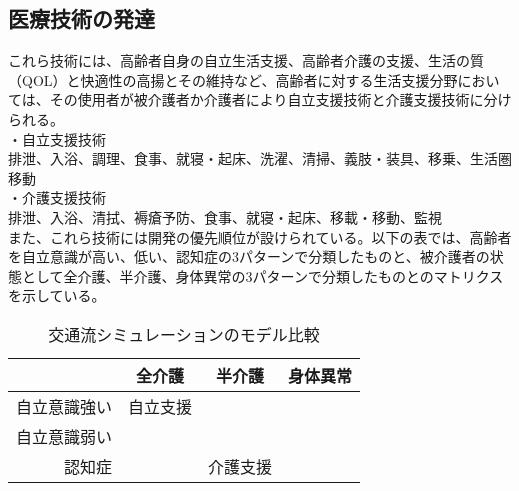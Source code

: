 
\subsection{医療技術の発達}


これら技術には、高齢者自身の自立生活支援、高齢者介護の支援、生活の質（QOL）と快適性の高揚とその維持など、高齢者に対する生活支援分野においては、その使用者が被介護者か介護者により自立支援技術と介護支援技術に分けられる。\\
・自立支援技術 \\
排泄、入浴、調理、食事、就寝・起床、洗濯、清掃、義肢・装具、移乗、生活圏移動 \\
・介護支援技術 \\
排泄、入浴、清拭、褥瘡予防、食事、就寝・起床、移載・移動、監視 \\
また、これら技術には開発の優先順位が設けられている。以下の表では、高齢者を自立意識が高い、低い、認知症の3パターンで分類したものと、被介護者の状態として全介護、半介護、身体異常の3パターンで分類したものとのマトリクスを示している。

\begin{table}[htb]
  \caption[交通流シミュレーションのモデル比較]{交通流シミュレーションのモデル比較}
  \label{model_explaination}
  \centering
  \begin{tabular}{r|c|c|c}
     & 全介護 & 半介護 & 身体異常 \\ \hline
    自立意識強い & 自立支援 & \quad & \quad \\
    自立意識弱い & \quad & \quad &  \quad \\
    認知症 & \quad & 介護支援 & \quad \\
    \end{tabular}
\end{table}

